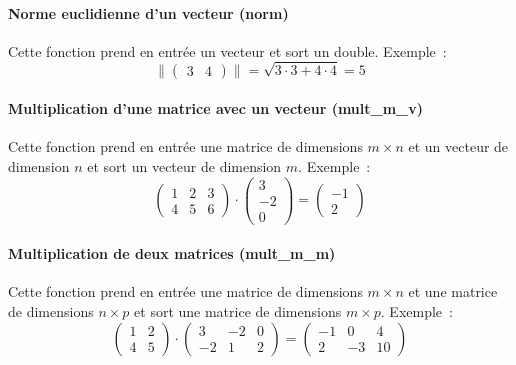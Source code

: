 \documentclass[a4paper, 12pt]{article}
\begin{document}
\paragraph{Norme euclidienne d'un vecteur (norm)}
Cette fonction prend en entrée un vecteur et sort un double. Exemple~:
\begin{equation*}
    \lVert \begin{pmatrix} 3 & 4 \end{pmatrix} \rVert
  = \sqrt{3 \cdot 3 + 4 \cdot 4} = 5
\end{equation*}

\paragraph{Multiplication d'une matrice avec un vecteur (mult\_m\_v)}
Cette fonction prend en entrée une matrice de dimensions $m \times n$ et un vecteur de dimension $n$ et sort un vecteur de dimension $m$. Exemple~:
\begin{equation*}
          \begin{pmatrix} 1  &  2 & 3 \\ 4 &  5 & 6   \end{pmatrix}
    \cdot \begin{pmatrix} 3  \\ -2 \\ 0 \end{pmatrix}
    =     \begin{pmatrix} -1 \\ 2 \end{pmatrix}
\end{equation*}

\paragraph{Multiplication de deux matrices (mult\_m\_m)}
Cette fonction prend en entrée une matrice de dimensions $m \times n$ et une matrice de dimensions $n \times p$ et sort une matrice de dimensions $m \times p$. Exemple~:
\begin{equation*}
          \begin{pmatrix} 1  &  2 \\ 4 &  5   \end{pmatrix}
    \cdot \begin{pmatrix} 3  & -2 & 0 \\ -2 &  1 & 2  \end{pmatrix}
    =     \begin{pmatrix} -1 &  0 & 4 \\  2 & -3 & 10 \end{pmatrix}
\end{equation*}
\end{document}
